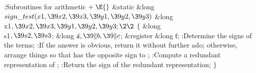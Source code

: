 \Y\B\4:Subroutines for arithmetic\X${}\mathrel+\E{}$\6
\1\1\&{static} \&{long} ${}\\{sign\_test}(\\{x1},\39\\{x2},\39\\{x3},\39\\{y1},%
\39\\{y2},\39\\{y3}){}$\6
\&{long} \\{x1}${},\39\\{x2},\39\\{x3},\39\\{y1},\39\\{y2},\39\\{y3};\2\2{}$\6
${}\{{}$\5
\1\&{long} \\{s1}${},\39\\{s2},\39\\{s3}{}$;\6
\&{long} \|a${},\39\|b,\39\|c{}$;\6
\&{register} \&{long} \|t;\7
:Determine the signs of the terms\X;\6
:If the answer is obvious, return it without further ado; otherwise,
arrange things so that  has the opposite sign to \X;\6
:Compute a redundant representation of \X;\6
:Return the sign of the redundant representation\X;\6
\4${}\}{}$\2\par
\fi

